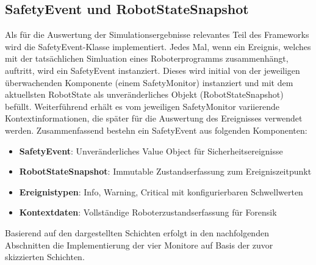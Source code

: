 \subsection{SafetyEvent und RobotStateSnapshot}
Als für die Auswertung der Simulationsergebnisse relevantes Teil des Frameworks
wird die SafetyEvent-Klasse implementiert. Jedes Mal, wenn ein Ereignis,
welches mit der tatsächlichen Simluation eines Roboterprogramms zusammenhängt,
auftritt, wird ein SafetyEvent instanziert. Dieses wird initial von der
jeweiligen überwachenden Komponente (einem SafetyMonitor) instanziert und mit
dem aktuellsten RobotState als unveränderliches Objekt
(RobotStateSnapshot) befüllt.
Weiterführend erhält es vom jeweiligen SafetyMonitor variierende
Kontextinformationen, die später für die Auswertung des Ereignisses verwendet
werden. Zusammenfassend bestehn ein SafetyEvent aus folgenden Komponenten:
\begin{itemize}
  \item \textbf{SafetyEvent}: Unveränderliches Value Object für
    Sicherheitsereignisse
  \item \textbf{RobotStateSnapshot}: Immutable Zustandserfassung zum
    Ereigniszeitpunkt
  \item \textbf{Ereignistypen}: Info, Warning, Critical mit
    konfigurierbaren Schwellwerten
  \item \textbf{Kontextdaten}: Vollständige Roboterzustandserfassung
    für Forensik
\end{itemize}

Basierend auf den dargestellten Schichten erfolgt in den
nachfolgenden Abschnitten die Implementierung der vier
Monitore auf Basis der zuvor skizzierten Schichten.
